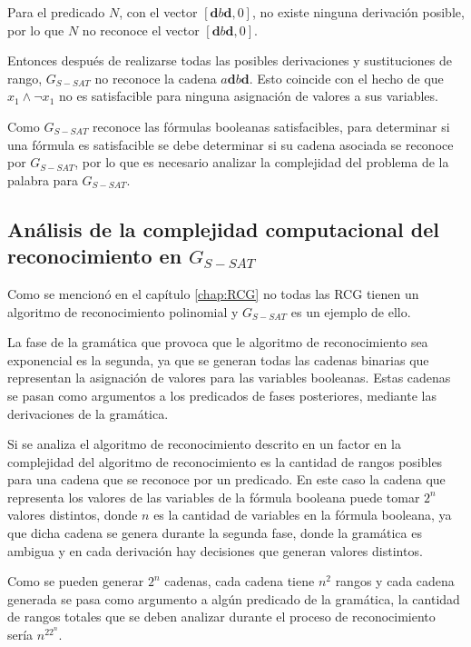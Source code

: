 Para el predicado $N$, con el vector $[\mathbf{d}b\mathbf{d},0]$, no existe ninguna derivación posible, por lo que 
$N$ no reconoce el vector $[\mathbf{d}b\mathbf{d},0]$.

Entonces después de realizarse todas las posibles derivaciones y sustituciones de rango, $G_{S-SAT}$ no reconoce la cadena
$a\mathbf{d}b\mathbf{d}$. Esto coincide con el hecho de que $x_1 \wedge \neg x_1$ no es satisfacible para ninguna asignación de valores a sus variables.


Como $G_{S-SAT}$ reconoce las fórmulas booleanas satisfacibles, para determinar si una fórmula es satisfacible se debe determinar si su cadena asociada se reconoce por $G_{S-SAT}$, por lo que es necesario analizar la complejidad del problema de la palabra para $G_{S-SAT}$.

\subsection{Análisis de la complejidad computacional del reconocimiento en $G_{S-SAT}$}

Como se mencionó en el capítulo \ref{chap:RCG} no todas las RCG tienen un algoritmo de reconocimiento polinomial 
y $G_{S-SAT}$ es un ejemplo de ello.

La fase de la gramática que provoca que le algoritmo de reconocimiento sea exponencial es la segunda, ya que  se generan 
todas las cadenas binarias que representan la asignación de valores para las variables booleanas.
Estas cadenas se pasan como argumentos a los predicados de fases posteriores, mediante las derivaciones de la gramática.

Si se analiza el algoritmo de reconocimiento descrito en \cite{mainRCGBib} un factor en la complejidad del 
algoritmo de reconocimiento es la cantidad de rangos posibles para una cadena que se reconoce por un predicado. 
En este caso la cadena que representa los valores de las variables de la fórmula booleana puede tomar $2^n$
valores distintos, donde $n$ es la cantidad de variables en la fórmula booleana, ya que dicha cadena se genera 
durante la segunda fase, donde la gramática es ambigua y en cada derivación hay decisiones que generan valores 
distintos.

Como se pueden generar $2^n$ cadenas, cada cadena tiene $n^2$ rangos y cada cadena generada se pasa como 
argumento a algún predicado de la gramática, la cantidad de rangos totales que se deben analizar durante 
el proceso de reconocimiento sería $n^22^n$.

